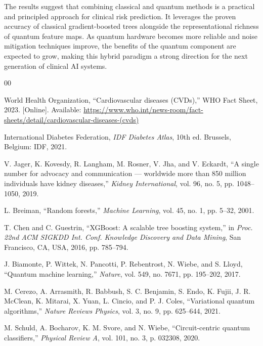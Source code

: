 ﻿\documentclass[conference]{IEEEtran}
\begin{document}
The results suggest that combining classical and quantum methods is a practical and
principled approach for clinical risk prediction. It leverages the proven accuracy of
classical gradient-boosted trees alongside the representational richness of quantum
feature maps. As quantum hardware becomes more reliable and noise mitigation techniques
improve, the benefits of the quantum component are expected to grow, making this hybrid
paradigm a strong direction for the next generation of clinical AI systems.

\begin{thebibliography}{00}

World Health Organization, ``Cardiovascular diseases (CVDs),'' WHO Fact Sheet, 2023.
[Online]. Available: \url{https://www.who.int/news-room/fact-sheets/detail/cardiovascular-diseases-(cvds)}

International Diabetes Federation, \textit{IDF Diabetes Atlas}, 10th ed.
Brussels, Belgium: IDF, 2021.

V. Jager, K. Kovesdy, R. Langham, M. Rosner, V. Jha, and V. Eckardt,
``A single number for advocacy and communication --- worldwide more than 850 million
individuals have kidney diseases,''
\textit{Kidney International}, vol. 96, no. 5, pp. 1048--1050, 2019.

L. Breiman, ``Random forests,''
\textit{Machine Learning}, vol. 45, no. 1, pp. 5--32, 2001.

T. Chen and C. Guestrin, ``XGBoost: A scalable tree boosting system,''
in \textit{Proc. 22nd ACM SIGKDD Int. Conf. Knowledge Discovery and Data Mining},
San Francisco, CA, USA, 2016, pp. 785--794.

J. Biamonte, P. Wittek, N. Pancotti, P. Rebentrost, N. Wiebe, and S. Lloyd,
``Quantum machine learning,''
\textit{Nature}, vol. 549, no. 7671, pp. 195--202, 2017.

M. Cerezo, A. Arrasmith, R. Babbush, S. C. Benjamin, S. Endo, K. Fujii,
J. R. McClean, K. Mitarai, X. Yuan, L. Cincio, and P. J. Coles,
``Variational quantum algorithms,''
\textit{Nature Reviews Physics}, vol. 3, no. 9, pp. 625--644, 2021.

M. Schuld, A. Bocharov, K. M. Svore, and N. Wiebe,
``Circuit-centric quantum classifiers,''
\textit{Physical Review A}, vol. 101, no. 3, p. 032308, 2020.


\end{thebibliography}
\end{document}
